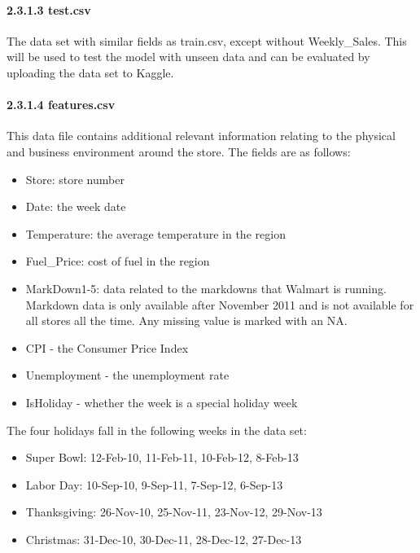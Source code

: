 \documentclass[]{article}
\begin{document}
\paragraph{2.3.1.3 test.csv}\label{test.csv}

The data set with similar fields as train.csv, except without
Weekly\_Sales. This will be used to test the model with unseen data and
can be evaluated by uploading the data set to Kaggle.

\paragraph{2.3.1.4 features.csv}\label{features.csv}

This data file contains additional relevant information relating to the
physical and business environment around the store. The fields are as
follows:

\begin{itemize}
\itemsep1pt\parskip0pt
\item
  Store: store number
\item
  Date: the week date
\item
  Temperature: the average temperature in the region
\item
  Fuel\_Price: cost of fuel in the region
\item
  MarkDown1-5: data related to the markdowns that Walmart is running.
  Markdown data is only available after November 2011 and is not
  available for all stores all the time. Any missing value is marked
  with an NA.
\item
  CPI - the Consumer Price Index
\item
  Unemployment - the unemployment rate
\item
  IsHoliday - whether the week is a special holiday week
\end{itemize}

The four holidays fall in the following weeks in the data set:

\begin{itemize}
\itemsep1pt\parskip0pt
\item
  Super Bowl: 12-Feb-10, 11-Feb-11, 10-Feb-12, 8-Feb-13
\item
  Labor Day: 10-Sep-10, 9-Sep-11, 7-Sep-12, 6-Sep-13
\item
  Thanksgiving: 26-Nov-10, 25-Nov-11, 23-Nov-12, 29-Nov-13
\item
  Christmas: 31-Dec-10, 30-Dec-11, 28-Dec-12, 27-Dec-13
\end{itemize}
\end{document}
